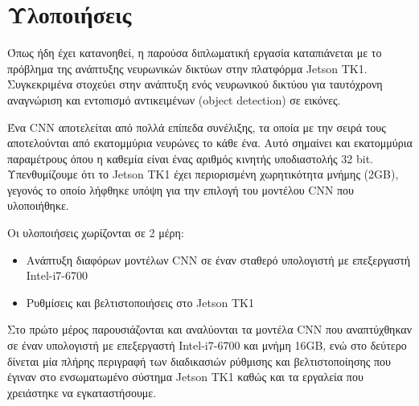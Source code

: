 \chapter{Υλοποιήσεις}
\label{chapter:implementations}

Όπως ήδη έχει κατανοηθεί, η παρούσα διπλωματική εργασία καταπιάνεται με το
πρόβλημα της ανάπτυξης νευρωνικών δικτύων στην πλατφόρμα Jetson TK1.
Συγκεκριμένα στοχεύει στην ανάπτυξη ενός νευρωνικού δικτύου για ταυτόχρονη
αναγνώριση και εντοπισμό αντικειμένων (object detection) σε εικόνες.

Ένα CNN αποτελείται από πολλά επίπεδα συνέλιξης, τα οποία με την σειρά τους
αποτελούνται από εκατομμύρια νευρώνες το κάθε ένα. Αυτό σημαίνει και εκατομμύρια
παραμέτρους όπου η καθεμία είναι ένας αριθμός κινητής υποδιαστολής 32 bit.
Υπενθυμίζουμε ότι το Jetson TK1 έχει περιορισμένη χωρητικότητα μνήμης (2GB),
γεγονός το οποίο λήφθηκε υπόψη για την επιλογή του μοντέλου CNN που υλοποιήθηκε.

Οι υλοποιήσεις χωρίζονται σε 2 μέρη:
\begin{itemize}
  \item{Ανάπτυξη διαφόρων μοντέλων CNN σε έναν σταθερό υπολογιστή με επεξεργαστή Intel-i7-6700}
  \item{Ρυθμίσεις και βελτιστοποιήσεις στο Jetson TK1}
\end{itemize}

Στο πρώτο μέρος παρουσιάζονται και αναλύονται τα μοντέλα CNN που αναπτύχθηκαν
σε έναν υπολογιστή με επεξεργαστή Intel-i7-6700 και μνήμη 16GB, ενώ στο
δεύτερο δίνεται μία πλήρης περιγραφή των διαδικασιών ρύθμισης και βελτιστοποίησης που έγιναν
στο ενσωματωμένο σύστημα Jetson TK1 καθώς και τα εργαλεία που χρειάστηκε να εγκαταστήσουμε.





